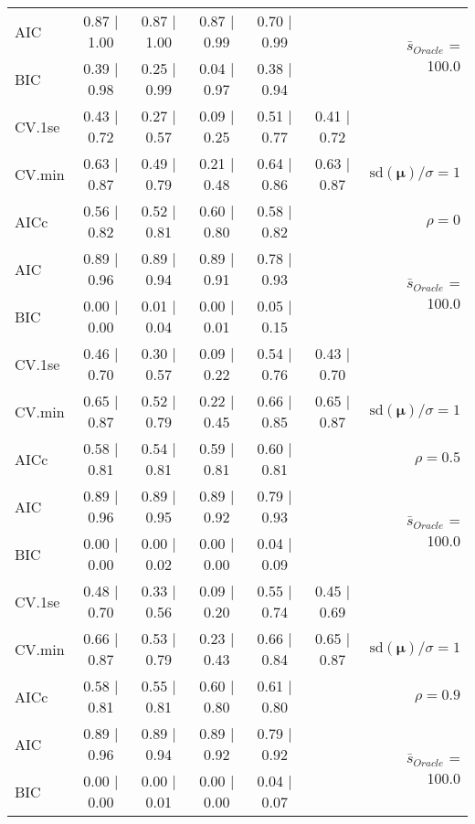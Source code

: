 \begin{table}
\begin{center}
\begin{tabular}{l*{5}{c}|r}
AIC & 0.87 $\mid$ 1.00 & 0.87 $\mid$ 1.00 & 0.87 $\mid$ 0.99 & 0.70 $\mid$ 0.99 & &  \multirow{2}{*}{$\bar{s}_{Oracle}$ = 100.0} \\
BIC & 0.39 $\mid$ 0.98 & 0.25 $\mid$ 0.99 & 0.04 $\mid$ 0.97 & 0.38 $\mid$ 0.94 & &  \\
 \hline 
CV.1se & 0.43 $\mid$ 0.72 & 0.27 $\mid$ 0.57 & 0.09 $\mid$ 0.25 & 0.51 $\mid$ 0.77 & 0.41 $\mid$ 0.72 & \\
CV.min & 0.63 $\mid$ 0.87 & 0.49 $\mid$ 0.79 & 0.21 $\mid$ 0.48 & 0.64 $\mid$ 0.86 & 0.63 $\mid$ 0.87 &  $\mathrm{sd}(\mathbf{\mu})/\sigma=1$ \\
AICc & 0.56 $\mid$ 0.82 & 0.52 $\mid$ 0.81 & 0.60 $\mid$ 0.80 & 0.58 $\mid$ 0.82 & & $\rho=0$ \\
AIC & 0.89 $\mid$ 0.96 & 0.89 $\mid$ 0.94 & 0.89 $\mid$ 0.91 & 0.78 $\mid$ 0.93 & &  \multirow{2}{*}{$\bar{s}_{Oracle}$ = 100.0} \\
BIC & 0.00 $\mid$ 0.00 & 0.01 $\mid$ 0.04 & 0.00 $\mid$ 0.01 & 0.05 $\mid$ 0.15 & &  \\
 \hline 
CV.1se & 0.46 $\mid$ 0.70 & 0.30 $\mid$ 0.57 & 0.09 $\mid$ 0.22 & 0.54 $\mid$ 0.76 & 0.43 $\mid$ 0.70 & \\
CV.min & 0.65 $\mid$ 0.87 & 0.52 $\mid$ 0.79 & 0.22 $\mid$ 0.45 & 0.66 $\mid$ 0.85 & 0.65 $\mid$ 0.87 &  $\mathrm{sd}(\mathbf{\mu})/\sigma=1$ \\
AICc & 0.58 $\mid$ 0.81 & 0.54 $\mid$ 0.81 & 0.59 $\mid$ 0.81 & 0.60 $\mid$ 0.81 & & $\rho=0.5$ \\
AIC & 0.89 $\mid$ 0.96 & 0.89 $\mid$ 0.95 & 0.89 $\mid$ 0.92 & 0.79 $\mid$ 0.93 & &  \multirow{2}{*}{$\bar{s}_{Oracle}$ = 100.0} \\
BIC & 0.00 $\mid$ 0.00 & 0.00 $\mid$ 0.02 & 0.00 $\mid$ 0.00 & 0.04 $\mid$ 0.09 & &  \\
 \hline 
CV.1se & 0.48 $\mid$ 0.70 & 0.33 $\mid$ 0.56 & 0.09 $\mid$ 0.20 & 0.55 $\mid$ 0.74 & 0.45 $\mid$ 0.69 & \\
CV.min & 0.66 $\mid$ 0.87 & 0.53 $\mid$ 0.79 & 0.23 $\mid$ 0.43 & 0.66 $\mid$ 0.84 & 0.65 $\mid$ 0.87 &  $\mathrm{sd}(\mathbf{\mu})/\sigma=1$ \\
AICc & 0.58 $\mid$ 0.81 & 0.55 $\mid$ 0.81 & 0.60 $\mid$ 0.80 & 0.61 $\mid$ 0.80 & & $\rho=0.9$ \\
AIC & 0.89 $\mid$ 0.96 & 0.89 $\mid$ 0.94 & 0.89 $\mid$ 0.92 & 0.79 $\mid$ 0.92 & &  \multirow{2}{*}{$\bar{s}_{Oracle}$ = 100.0} \\
BIC & 0.00 $\mid$ 0.00 & 0.00 $\mid$ 0.01 & 0.00 $\mid$ 0.00 & 0.04 $\mid$ 0.07 & &  \\

\end{tabular}
\end{center}
\end{table}
